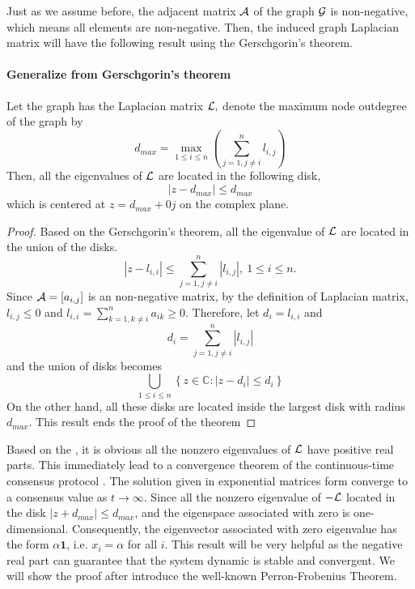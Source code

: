 Just as we assume before, the adjacent matrix ${\cal A}$ of the graph
${\cal G}$ is non-negative, which means all elements are non-negative.
Then, the induced graph Laplacian matrix will have the following result
using the Gerschgorin's theorem. 


\paragraph{Generalize from Gerschgorin's theorem}
\begin{thm}
\cite{Olfati-Saber2004} \label{thm:Bounds of eig(L)}Let the graph
has the Laplacian matrix ${\cal L},$ denote the maximum node outdegree
of the graph by 
\begin{equation}
d_{max}=\max_{1\leq i\leq n}\left(\sum_{j=1,j\neq i}^{n}l_{i,j}\right)
\end{equation}
Then, all the eigenvalues of ${\cal L}$ are located in the following
disk,
\begin{equation}
\left|z-d_{max}\right|\leq d_{max}
\end{equation}
which is centered at $z=d_{max}+0j$ on the complex plane.\end{thm}
\begin{proof}
Based on the Gerschgorin's theorem, all the eigenvalue of ${\cal L}$
are located in the union of the disks.
\begin{equation}
\left|z-l_{i,i}\right|\leq\sum_{j=1,j\neq i}^{n}\left|l_{i,j}\right|,\ 1\leq i\leq n.\label{eq:disk Union of eig(L)}
\end{equation}
Since ${\cal A}=\left[a_{i,j}\right]$ is an non-negative matrix,
by the definition of Laplacian matrix, $l_{i,j}\leq0$ and $l_{i,i}=\sum_{k=1,k\neq i}^{n}a_{ik}\geq0.$
Therefore, let $d_{i}=l_{i,i}$ and 
\begin{equation}
d_{i}=\sum_{j=1,j\neq i}^{n}\left|l_{i,j}\right|
\end{equation}
 and the union of disks becomes
\begin{equation}
\bigcup_{1\leq i\leq n}\left\{ z\in\mathbb{C}:\left|z-d_{i}\right|\leq d_{i}\right\} 
\end{equation}
On the other hand, all these disks are located inside the largest
disk with radius $d_{max}$. This result ends the proof of the theorem
\end{proof}
Based on the , it is obvious all
the nonzero eigenvalues of ${\cal L}$ have positive real parts. This
immediately lead to a convergence theorem of the continuous-time consensus
protocol . The solution given in
exponential matrices form  converge
to a consensus value as $t\to\infty$. Since all the nonzero eigenvalue
of $-{\cal L}$ located in the disk $\left|z+d_{max}\right|\leq d_{max}$,
and the eigenspace associated with zero is one-dimensional. Consequently,
the eigenvector associated with zero eigenvalue has the form $\alpha\mathbf{1}$,
i.e. $x_{i}=\alpha$ for all $i$. This result will be very helpful
as the negative real part can guarantee that the system dynamic is
stable and convergent. We will show the proof after introduce the
well-known Perron-Frobenius Theorem. 


